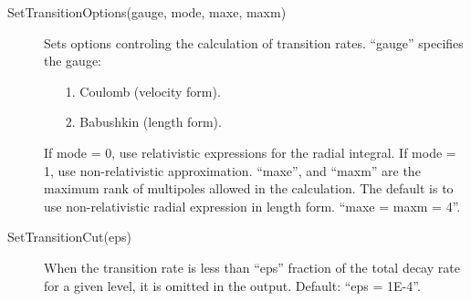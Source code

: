 \documentclass[12pt]{article}
\begin{document}
\begin{description}
\item[SetTransitionOptions(gauge, mode, maxe, maxm)] Sets options controling
the calculation of transition rates. ``gauge'' specifies the gauge: 
\begin{enumerate}
\item[1.] Coulomb (velocity form).
\item[2.] Babushkin (length form). 
\end{enumerate}
If mode = 0, use relativistic expressions
for the radial integral. If mode = 1, use non-relativistic approximation. 
``maxe'', and ``maxm'' are the maximum rank of multipoles allowed in the
calculation. The default is to use non-relativistic radial expression in
length form. ``maxe = maxm = 4''. 

\item[SetTransitionCut(eps)] 
When the transition rate is less than ``eps'' fraction of the total decay rate
for a given level, it is omitted in the output. Default: ``eps = 1E-4''. 

\end{description}
\end{document}
